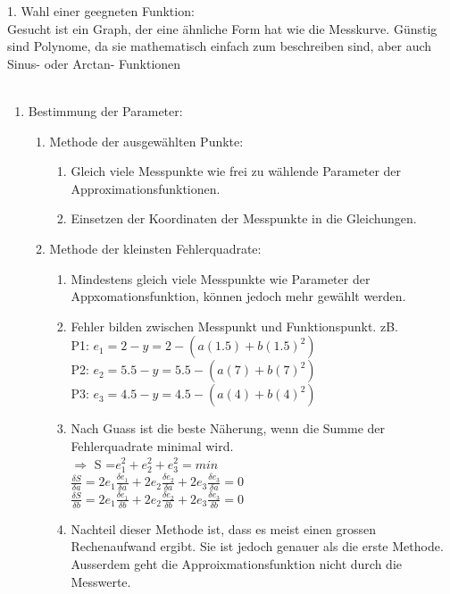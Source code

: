      	1. Wahl einer geegneten Funktion:\\
     	Gesucht ist ein Graph, der eine ähnliche Form
		hat wie die Messkurve. Günstig sind Polynome, da sie mathematisch einfach zum
		beschreiben sind, aber auch Sinus- oder Arctan- Funktionen	\\ 
        \\
     	\begin{enumerate}[start=2]
        \item Bestimmung der Parameter:
          \begin{enumerate}
           \item Methode der ausgewählten Punkte:\\
          		\begin{enumerate}
                    \item Gleich viele Messpunkte wie frei zu wählende Parameter der
           			Approximationsfunktionen.
           			\item Einsetzen der Koordinaten der Messpunkte in die Gleichungen.
           		\end{enumerate}
           	\item Methode der kleinsten Fehlerquadrate:
           		\begin{enumerate}
                     \item Mindestens gleich viele Messpunkte wie Parameter der
           		Appxomationsfunktion, können jedoch mehr gewählt werden.
           		\item Fehler bilden zwischen Messpunkt und Funktionspunkt. zB.\\
           		P1:  $e_1=2-y=2-(a(1.5)+b(1.5)^2)$\\
           		P2:  $e_2=5.5-y=5.5-(a(7)+b(7)^2)$\\
           		P3:  $e_3=4.5-y=4.5-(a(4)+b(4)^2)$\\
           		\item Nach Guass ist die beste Näherung, wenn die Summe der
           		Fehlerquadrate minimal wird. \\
           		$\Longrightarrow$ S =$ e_1^2+e_2^2+e_3^2=min$\\
           		$\frac{\delta S}{\delta a}=
           		2 e_1 \frac{\delta e_1}{\delta a}+
           		2 e_2 \frac{\delta e_2}{\delta a}+
           		2 e_3 \frac{\delta e_3}{\delta a}=0$\\
           		$\frac{\delta S}{\delta b}=
           		2 e_1 \frac{\delta e_1}{\delta b}+
           		2 e_2 \frac{\delta e_2}{\delta b}+
           		2 e_3 \frac{\delta e_3}{\delta b}=0$\\
           		\item Nachteil dieser Methode ist, dass es meist einen grossen
           		Rechenaufwand ergibt. Sie ist jedoch genauer als die erste Methode.
           		Ausserdem geht die Approixmationsfunktion nicht durch die Messwerte.
           		\end{enumerate}
		\end{enumerate}
	\end{enumerate}
    
